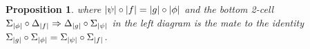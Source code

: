 \documentclass[11pt, oneside, article]{memoir}
\theoremstyle{plain}
\newtheorem{proposition}[theorem]{Proposition}
\theoremstyle{definition}
\theoremstyle{remark}
\DeclarePairedDelimiter{\abs}{\lvert}{\rvert}
\newcommand{\cat}[1]{\mathbf{#1}}
\newcommand{\CoalgOn}[2]{{#2}^{#1}}
\newcommand{\CoalgS}[1]{\CoalgOn{#1}{\bS}}
\newcommand{\pts}[1]{{\abs{#1}}}
\newcommand{\one}[1]{\pts{#1}}
\newcommand{\ptlift}[1]{\overline{#1}}
\newcommand{\carr}{\Sigma}
\newcommand{\leindex}[1]{\Sigma_{#1}}
\newcommand{\reindex}[1]{\Delta_{#1}}
\newcommand{\car}[1]{\carr^{#1}}
\newcommand{\carA}{\car{\cA}}
\newcommand{\carB}{\car{\cB}}
\newcommand{\carC}{\car{\cC}}
\newcommand{\carD}{\car{\cD}}
\newcommand{\com}[2]{{#1}^{#2}}
\newcommand{\con}[2]{{#1}^{#2}}
\newcommand{\cmnd}[1]{{#1}}
\newcommand{\cA}{\cmnd{A}}
\newcommand{\cB}{\cmnd{B}}
\newcommand{\cC}{\cmnd{C}}
\newcommand{\cD}{\cmnd{D}}
\newcommand{\bS}{\cat{S}}
\newcommand{\AS}{\CoalgS{\cA}}
\newcommand{\BS}{\CoalgS{\cB}}
\newcommand{\CS}{\CoalgS{\cC}}
\newcommand{\DS}{\CoalgS{\cD}}
\newcommand{\SA}{\bS/\pts{\cA}}
\newcommand{\SB}{\bS/\pts{\cB}}
\newcommand{\SC}{\bS/\pts{\cC}}
\newcommand{\SD}{\bS/\pts{\cD}}
\begin{document}
\begin{proposition}

  \noindent
  where $\one{\psi} \circ \one{f} = \one{g} \circ \one{\phi}$ and
  the bottom 2-cell
  $\leindex{\one{\phi}} \circ \reindex{\one{f}} \Rightarrow \reindex{\one{g}}
  \circ \leindex{\one{\psi}}$ in the left diagram is the mate to the
  identity
  $\leindex{\one{g}} \circ \leindex{\one{\phi}} = \leindex{\one{\psi}} \circ
  \leindex{\one{f}}$.
\end{proposition}
\end{document}
